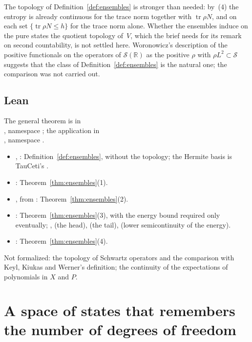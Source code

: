 \documentclass[11pt]{article}
\theoremstyle{definition}
\begin{document}
The topology of Definition~\ref{def:ensembles} is stronger than needed: by~(4) the entropy is
already continuous for the trace norm together with $\operatorname{tr}\rho N$, and on each set
$\{\operatorname{tr}\rho N \le h\}$ for the trace norm alone. Whether the ensembles induce on the
pure states the quotient topology of~$V$, which the brief needs for its remark on second
countability, is not settled here. Woronowicz's description of the positive functionals on the
operators of $\mathcal S(\mathbb R)$ as the positive $\rho$ with $\rho L^2 \subset \mathcal S$
\cite{woronowicz71} suggests that the class of Definition~\ref{def:ensembles} is the natural one;
the comparison was not carried out.

\subsection{Lean}

The general theorem is in\\ , namespace
; the application in\\
, namespace
.
\begin{itemize}
  \item {}, : Definition~\ref{def:ensembles}, without the
    topology; the Hermite basis is TauCeti's .
  \item {}: Theorem~\ref{thm:ensembles}(1).
  \item {}, from :
    Theorem~\ref{thm:ensembles}(2).
  \item {}: Theorem~\ref{thm:ensembles}(3), with the energy bound
    required only eventually; ,  (the
    head),  (the tail),  (lower semicontinuity of
    the energy).
  \item {}: Theorem~\ref{thm:ensembles}(4).
\end{itemize}
Not formalized: the topology of Schwartz operators and the comparison with Keyl, Kiukas and
Werner's definition; the continuity of the expectations of polynomials in $X$ and $P$.

\section{A space of states that remembers the number of degrees of freedom}
\label{sec:gelfandshilov}
\end{document}

